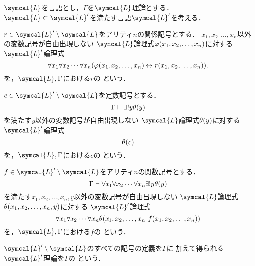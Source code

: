 \begin{Def} \label{Def:extensionbydefinition}
	\(\symcal{L}\)を言語とし，\(\Gamma\)を\(\symcal{L}\)理論とする．
	\(\symcal{L} \subset \symcal{L}'\)を満たす言語\(\symcal{L}'\)を考える．

	\(r \in \symcal{L}' \setminus \symcal{L}\)をアリティ\(n\)の関係記号とする．
	\(x_1, x_2, \dots, x_n\)以外の変数記号が自由出現しない
	\(\symcal{L}\)論理式\(\apply{\varphi}{x_1, x_2, \dots, x_n}\)に対する
	\(\symcal{L}'\)論理式
	\begin{equation}
		\forall x_1 \forall x_2 \dotsb \forall x_n \paren{\apply{\varphi}{x_1, x_2, \dots, x_n} \formulaequiv \apply{r}{x_1, x_2, \dots, x_n}}.
		\label{eq:extensionbydefinitionrelationalsymbol}
	\end{equation}
	を，\(\symcal{L}, \Gamma\)における\(r\)の
	という．

	\(c \in \symcal{L}' \setminus \symcal{L}\)を定数記号とする．
	\begin{equation}
		\Gamma \provable \uexists y \apply{\theta}{y}
		\label{eq:definitionconstantsymbol}
	\end{equation}
	を満たす\(y\)以外の変数記号が自由出現しない
	\(\symcal{L}\)論理式\(\apply{\theta}{y}\)に対する
	\(\symcal{L}'\)論理式
	\begin{equation}
		\apply{\theta}{c}
		\label{eq:extensionbydefinitionconstantsymbol}
	\end{equation}
	を，\(\symcal{L}, \Gamma\)における\(c\)の%
	という．

	\(f \in \symcal{L}' \setminus \symcal{L}\)をアリティ\(n\)の関数記号とする．
	\begin{equation}
		\Gamma \provable \forall x_1 \forall x_2 \dotsb \forall x_n \uexists y \apply{\theta}{y}
		\label{eq:definitionfunctionsymbol}
	\end{equation}
	を満たす\(x_1, x_2, \dots, x_n, y\)以外の変数記号が自由出現しない
	\(\symcal{L}\)論理式\(\apply{\theta}{x_1, x_2, \dots, x_n, y}\)に対する
	\(\symcal{L}'\)論理式
	\begin{equation}
		\forall x_1 \forall x_2 \dotsb \forall x_n \apply{\theta}{x_1, x_2, \dots, x_n, \apply{f}{x_1, x_2, \dots, x_n}}
		\label{eq:extensionbydefinitionfunctionsymbol}
	\end{equation}
	を，\(\symcal{L}, \Gamma\)における\(f\)の%
	という．

	\(\symcal{L}' \setminus \symcal{L}\)のすべての記号の定義を\(\Gamma\)に
	加えて得られる\(\symcal{L}'\)理論を\(\Gamma\)の%
	という．
\end{Def}

